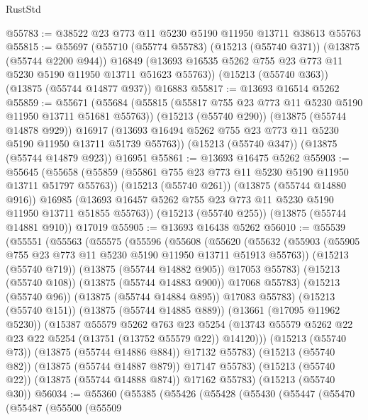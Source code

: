 \begin{lexlean}{RustStd}
\begin{coremodule}
@55783 := @38522 @23 @773 @11 @5230 @5190 @11950 @13711 @38613 @55763
@55815 := @55697
    (@55710
      (@55774 @55783)
      (@15213 (@55740 @371))
      (@13875 (@55744 @2200 @944))
      @16849
      (@13693 @16535 @5262 @755 @23 @773 @11 @5230 @5190 @11950 @13711 @51623 @55763))
    (@15213 (@55740 @363))
    (@13875 (@55744 @14877 @937))
    @16883
@55817 := @13693 @16514 @5262
@55859 := @55671
    (@55684
      (@55815 (@55817 @755 @23 @773 @11 @5230 @5190 @11950 @13711 @51681 @55763))
      (@15213 (@55740 @290))
      (@13875 (@55744 @14878 @929))
      @16917
      (@13693 @16494 @5262 @755 @23 @773 @11 @5230 @5190 @11950 @13711 @51739 @55763))
    (@15213 (@55740 @347))
    (@13875 (@55744 @14879 @923))
    @16951
@55861 := @13693 @16475 @5262
@55903 := @55645
    (@55658
      (@55859 (@55861 @755 @23 @773 @11 @5230 @5190 @11950 @13711 @51797 @55763))
      (@15213 (@55740 @261))
      (@13875 (@55744 @14880 @916))
      @16985
      (@13693 @16457 @5262 @755 @23 @773 @11 @5230 @5190 @11950 @13711 @51855 @55763))
    (@15213 (@55740 @255))
    (@13875 (@55744 @14881 @910))
    @17019
@55905 := @13693 @16438 @5262
@56010 := @55539
    (@55551
      (@55563
        (@55575
          (@55596
            (@55608
              (@55620
                (@55632
                  (@55903 (@55905 @755 @23 @773 @11 @5230 @5190 @11950 @13711 @51913 @55763))
                  (@15213 (@55740 @719))
                  (@13875 (@55744 @14882 @905))
                  @17053
                  @55783)
                (@15213 (@55740 @108))
                (@13875 (@55744 @14883 @900))
                @17068
                @55783)
              (@15213 (@55740 @96))
              (@13875 (@55744 @14884 @895))
              @17083
              @55783)
            (@15213 (@55740 @151))
            (@13875 (@55744 @14885 @889))
            (@13661 (@17095 @11962 @5230))
            (@15387
              @55579
              @5262
              @763
              @23
              @5254
              (@13743 @55579 @5262 @22 @23 @22 @5254 (@13751 (@13752 @55579 @22)) @14120)))
          (@15213 (@55740 @73))
          (@13875 (@55744 @14886 @884))
          @17132
          @55783)
        (@15213 (@55740 @82))
        (@13875 (@55744 @14887 @879))
        @17147
        @55783)
      (@15213 (@55740 @22))
      (@13875 (@55744 @14888 @874))
      @17162
      @55783)
    (@15213 (@55740 @30))
@56034 := @55360
    (@55385
      (@55426
        (@55428
          (@55430
            (@55447
              (@55470
                (@55487
                  (@55500
                    (@55509

\end{coremodule}
\end{lexlean}
